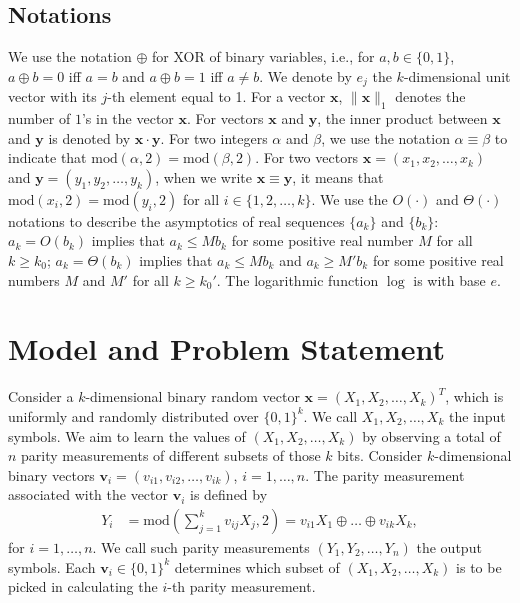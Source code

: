 \documentclass[11pt,onecolumn]{IEEEtran}
\renewcommand{\mod}{\mathrm{mod}}
\newcommand{\beq}{\begin{equation}}
\newcommand{\eeq}{\end{equation}}
\newcommand{\bx}{\mathbf{x}}
\newcommand{\by}{\mathbf{y}}
\begin{document}
\subsection{Notations}
We use the notation $\oplus$ for XOR of binary variables, i.e., for $a,b\in\{0,1\}$, $a\oplus b=0$ iff $a=b$ and $a\oplus b=1$ iff $a\neq b$.
We denote by $e_j$ the $k$-dimensional unit vector with its $j$-th element equal to 1.
For a vector $\bx$, $\|\bx\|_1$ denotes the number of $1$'s in the vector $\bx$.
For vectors $\bx$ and $\by$, the inner product between $\bx$ and $\by$ is denoted by $\bx \cdot \by$.
For two integers $\alpha$ and $\beta$, we use the notation $\alpha\equiv \beta$ to indicate that $\mod(\alpha,2)=\mod(\beta,2)$.
For two vectors $\bx=(x_1,x_2,\dots, x_k)$ and $\by=(y_1,y_2,\dots, y_k)$, when we write $\bx\equiv \by$, it means that $\mod(x_i,2)=\mod(y_i,2)$ for all $i\in\{1,2,\dots,k\}$.
We use the $O(\cdot)$ and $\Theta(\cdot)$ notations to describe the asymptotics of real sequences $\{a_k\}$ and $\{b_k\}$: $a_k=O(b_k)$ implies that $a_k\leq M b_k$ for some positive real number $M$ for all $k\geq k_0$; $a_k=\Theta(b_k)$ implies that $a_k\leq M b_k$ and $a_k \geq M' b_k$ for some positive real numbers $M$ and $M'$ for all $k\geq k_0'$.
The logarithmic function $\log$ is with base $e$.

\section{Model and Problem Statement}\label{sec:model}
Consider a $k$-dimensional binary random vector $\bx=(X_1, X_2,\dots, X_k)^T$, which is uniformly and randomly distributed over $\{0,1\}^k$. We call $X_1,X_2,\dots, X_k$ the input symbols. 
We aim to learn the values of $(X_1, X_2,\dots, X_k)$ by observing a total of $n$ parity measurements of different subsets of those $k$ bits. 
Consider $k$-dimensional binary vectors $\mathbf{v}_i=(v_{i1},v_{i2},\dots, v_{ik})$, $i=1,\dots,n$. The parity measurement associated with the vector $\mathbf{v}_i$ is defined by
\beq
\begin{aligned}
Y_i&=\mod\left( \sum_{j=1}^k v_{ij} X_j, 2\right)=v_{i1}X_1\oplus \dots\oplus v_{ik}X_k,
\end{aligned}
\eeq
for $i=1,\dots, n$. We call such parity measurements $(Y_1,Y_2,\dots, Y_n)$ the output symbols. 
Each $\mathbf{v}_i\in\{0,1\}^k$ determines which subset of $(X_1, X_2,\dots, X_k)$ is to be picked in calculating the $i$-th parity measurement.
\end{document}
